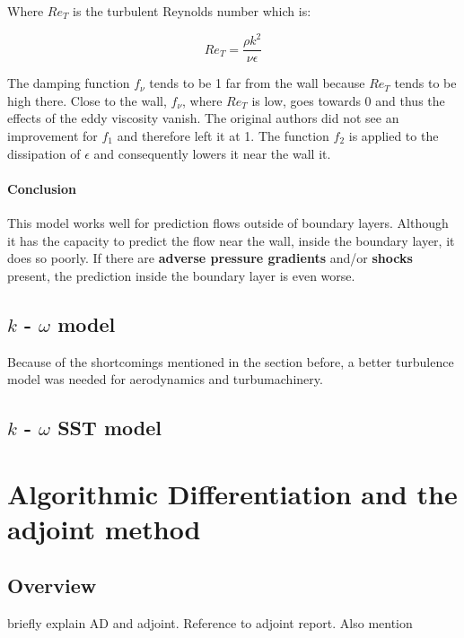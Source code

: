 \noindent Where $Re_T$ is the turbulent Reynolds number which is:

\begin{equation}
    Re_T = \frac{\rho k^2}{\nu \epsilon} 
\end{equation}

\noindent The damping function $f_{\nu}$ tends to be 1 far from the wall
because $Re_T$ tends to be high there. Close to the wall, $f_{\nu}$, where
$Re_T$ is low, goes towards 0 and thus the effects of the eddy viscosity
vanish. The original authors did not see an improvement for $f_1$ and therefore
left it at 1. The function $f_2$ is applied to the dissipation of $\epsilon$
and consequently lowers it near the wall it.


\paragraph{Conclusion}
This model works well for prediction flows outside of boundary layers. Although
it has the capacity to predict the flow near the wall, inside the boundary
layer, it does so poorly. If there are \textbf{adverse pressure gradients}
and/or \textbf{shocks} present, the prediction inside the boundary layer is
even worse. \cite{cfd101_k-epsilon}



\subsection{$k$ - $\omega$ model}
Because of the shortcomings mentioned in the section before, a better
turbulence model was needed for aerodynamics and turbumachinery.






\subsection{$k$ - $\omega$ SST model}




\section{Algorithmic Differentiation and the adjoint method}
\subsection{Overview}
briefly explain AD and adjoint. Reference to adjoint report. Also mention  



